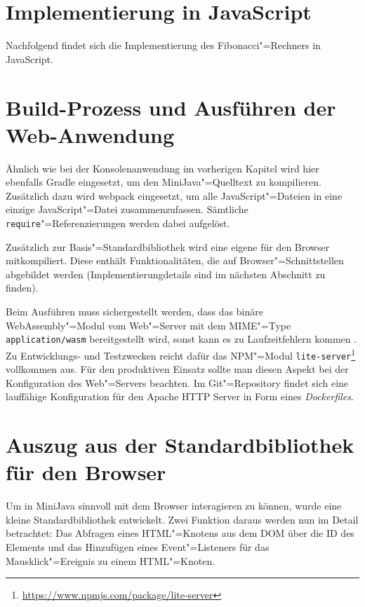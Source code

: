 \section{Implementierung in JavaScript}

Nachfolgend findet sich die Implementierung des Fibonacci"=Rechners in JavaScript.


\section{Build-Prozess und Ausführen der Web-Anwendung}

Ähnlich wie bei der Konsolenanwendung im vorherigen Kapitel wird hier ebenfalls Gradle eingesetzt, um den MiniJava"=Quelltext zu kompilieren. Zusätzlich dazu wird webpack \cite{Webpack} eingesetzt, um alle JavaScript"=Dateien in eine einzige JavaScript"=Datei zusammenzufassen. Sämtliche \lstinline{require}"=Referenzierungen werden dabei aufgelöst.

Zusätzlich zur Basis"=Standardbibliothek wird eine eigene für den Browser mitkompiliert. Diese enthält Funktionalitäten, die auf Browser"=Schnittstellen abgebildet werden (Implementierungdetails sind im nächsten Abschnitt zu finden).

Beim Ausführen muss sichergestellt werden, dass das binäre WebAssembly"=Modul vom Web"=Server mit dem MIME"=Type \lstinline{application/wasm} bereitgestellt wird, sonst kann es zu Laufzeitfehlern kommen \cite{MDNWebAssembly}. Zu Entwicklungs- und Testzwecken reicht dafür das NPM"=Modul \lstinline{lite-server}\footnote{\url{https://www.npmjs.com/package/lite-server}} vollkommen aus. Für den produktiven Einsatz sollte man diesen Aspekt bei der Konfiguration des Web"=Servers beachten. Im Git"=Repository findet sich eine lauffähige Konfiguration für den Apache HTTP Server in Form eines \emph{Dockerfiles}.

\section{Auszug aus der Standardbibliothek für den Browser}

Um in MiniJava sinnvoll mit dem Browser interagieren zu können, wurde eine kleine Standardbibliothek entwickelt. Zwei Funktion daraus werden nun im Detail betrachtet: Das Abfragen eines HTML"=Knotens aus dem DOM über die ID des Elements und das Hinzufügen eines Event"=Listeners für das Mausklick"=Ereignis zu einem HTML"=Knoten.

